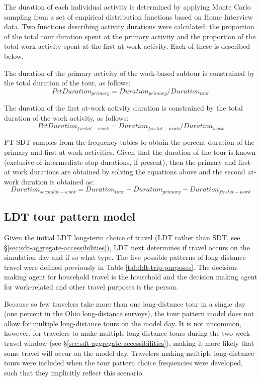\noindent The duration of each individual activity is determined by applying Monte Carlo sampling from a set of empirical distribution functions based on Home Interview data. Two functions describing activity durations were calculated: the proportion of the total tour duration spent at the primary activity and the proportion of the total work activity spent at the first at-work activity. Each of these is described below.

The duration of the primary activity of the work-based subtour is constrained by the total duration of the tour, as follows:
\begin{equation}
PctDuration_{primary} = Duration_{primary} / Duration_{tour}
\label{eq:pt-work-primary-duration}
\end{equation}

\noindent The duration of the first at-work activity duration is constrained by the total duration of the work activity, as follows:
\begin{equation}
PctDuration_{first at-work} = Duration_{first at-work} / Duration_{work}
\label{eq:pt-at-work-duration}
\end{equation}

\noindent PT SDT samples from the frequency tables to obtain the percent duration of the primary and first at-work activities. Given that the duration of the tour is known (exclusive of intermediate stop durations, if present), then the primary and first-at work durations are obtained by solving the equations above and the second at-work duration is obtained as:
\begin{equation}
Duration_{second at-work} = Duration_{tour} - Duration_{primary} - Duration_{first at-work}
\end{equation}

\subsection{LDT tour pattern model}\label{sec:ldt-tour-pattern}
Given the initial LDT long-term choice of travel (LDT rather than SDT, see \S\ref{sec:sdt-aggregate-accessibilities}), LDT next determines if travel occurs on the simulation day and if so what type. The five possible patterns of long distance travel were defined previously in Table \ref{tab:ldt-trip-purposes}. The decision-making agent for household travel is the household and the decision making agent for work-related and other travel purposes is the person.

Because so few travelers take more than one long-distance tour in a single day (one percent in the Ohio long-distance surveys), the tour pattern model does not allow for multiple long-distance tours on the model day. It is not uncommon, however, for travelers to make multiple long-distance tours during the two-week travel window (see \S\ref{sec:sdt-aggregate-accessibilities}), making it more likely that some travel will occur on the model day. Travelers making multiple long-distance tours were included when the tour pattern choice frequencies were developed, such that they implicitly reflect this scenario.

